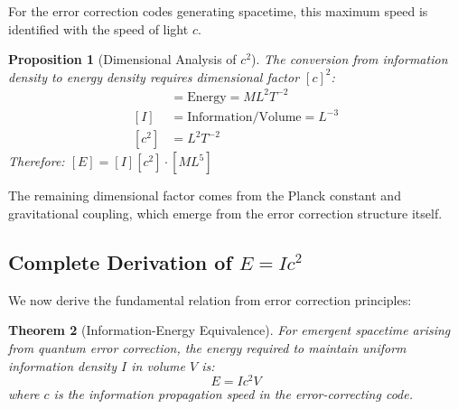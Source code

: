 \documentclass[12pt,a4paper]{article}
\newtheorem{theorem}{Theorem}[section]
\newtheorem{proposition}[theorem]{Proposition}
\theoremstyle{remark}
\begin{document}
For the error correction codes generating spacetime, this maximum speed is identified with the speed of light $c$.

\begin{proposition}[Dimensional Analysis of $c^2$]
The conversion from information density to energy density requires dimensional factor $[c]^2$:
\begin{align}
[E] &= \text{Energy} = ML^2T^{-2} \\
[I] &= \text{Information}/\text{Volume} = L^{-3} \\
[c^2] &= L^2T^{-2}
\end{align}
Therefore: $[E] = [I][c^2] \cdot [M L^5]$
\end{proposition}

The remaining dimensional factor comes from the Planck constant and gravitational coupling, which emerge from the error correction structure itself.

\subsection{Complete Derivation of $E = Ic^2$}

We now derive the fundamental relation from error correction principles:

\begin{theorem}[Information-Energy Equivalence]
\label{thm:main}
For emergent spacetime arising from quantum error correction, the energy required to maintain uniform information density $I$ in volume $V$ is:
\begin{equation}
E = Ic^2 V
\end{equation}
where $c$ is the information propagation speed in the error-correcting code.
\end{theorem}
\end{document}
